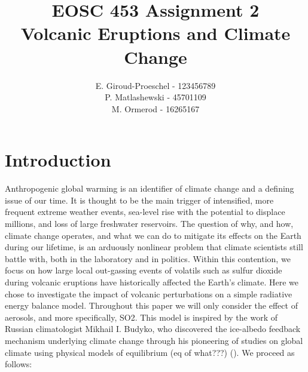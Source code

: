 \documentclass[12pt]{article}
\title{EOSC 453 Assignment 2\\
\large Volcanic Eruptions and Climate Change}
\author{
    E. Giroud-Proeschel - 123456789 \\
    P. Matlashewski - 45701109\\
    M. Ormerod - 16265167
}
\begin{document}
\maketitle
\newpage
\tableofcontents
\newpage

\section{Introduction}
Anthropogenic global warming is an identifier of climate change and a defining 
issue of our time. It is thought to be the main trigger of intensified, more frequent
extreme weather events, sea-level rise with the potential
to displace millions, and loss of large freshwater reservoirs.
The question of why, and how, climate change operates, and what we can do to mitigate 
its effects on the Earth during our lifetime, is an arduously nonlinear problem that climate scientists
still battle with, both in the laboratory and in politics. Within this contention, we focus on
how large local out-gassing events of volatils such as sulfur dioxide during volcanic eruptions
have historically affected the Earth's climate. Here we chose to investigate
the impact of volcanic perturbations on a simple radiative
energy balance model. Throughout this paper we will only consider the effect of aerosols,
and more specifically, SO2. This model is inspired by the
work of Russian climatologist Mikhail I. Budyko, who discovered the ice-albedo
feedback mechanism underlying climate change through his pioneering of studies
on global climate using physical models of equilibrium (eq of what???) (\cite{budyko_albedo}).
We proceed as follows:

\end{document}
